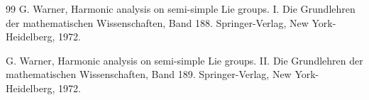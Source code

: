 \documentclass[11 pt]{amsart}
\theoremstyle{definition}
\numberwithin{equation}{section}
\begin{document}
\begin{thebibliography}{99}
 G. Warner, Harmonic analysis on semi-simple Lie groups. I. Die Grundlehren der mathematischen Wissenschaften,
Band 188. Springer-Verlag, New York-Heidelberg, 1972.


 G. Warner, Harmonic analysis on semi-simple Lie groups. II. Die Grundlehren der mathematischen Wissenschaften,
Band 189. Springer-Verlag, New York-Heidelberg, 1972.



\end{thebibliography}
\end{document}
